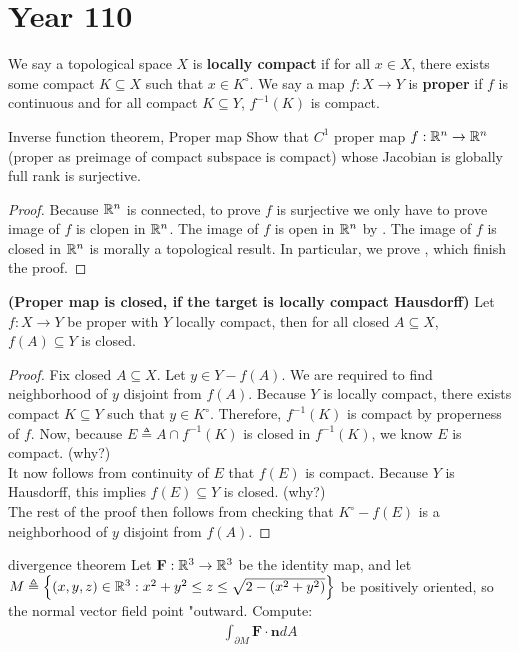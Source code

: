 \documentclass{report}
\begin{document}
\section{Year 110}
We say a topological space $X$ is \textbf{locally compact} if for all $x \in X$, there exists some compact $K \subseteq X$ such that $x \in K^{\circ }$. We say a map $f:X\rightarrow Y$ is \textbf{proper} if $f$ is continuous and for all compact $K\subseteq Y$, $f^{-1}(K)$ is compact.
\begin{question}{Inverse function theorem, Proper map}{}
  Show that $C^1$ proper map  $f:\mathbb{R}^n\rightarrow \mathbb{R}^n$ (proper as preimage of compact subspace is compact) whose Jacobian is globally full rank is surjective. 
\end{question}
\begin{proof}
  Because $\mathbb{R}^n$ is connected,  to prove $f$ is surjective we only have to prove image of $f$ is clopen in $\mathbb{R}^n$. The image of $f$ is open in $\mathbb{R}^n$ by . The image of $f$ is closed in $\mathbb{R}^n$ is morally a topological result. In particular, we prove  , which finish the proof.
\end{proof}
\begin{theorem}
\label{THpmic}
\textbf{(Proper map is closed, if the target is locally compact Hausdorff)} Let $f:X\rightarrow Y$ be proper with $Y$ locally compact, then for all closed $A \subseteq X$, $f(A)\subseteq Y$ is closed.
\end{theorem}
\begin{proof}
Fix closed $A\subseteq X$. Let $y \in Y- f(A)$. We are required to find neighborhood of $y$ disjoint from $f(A)$. Because $Y$ is locally compact, there exists compact $K \subseteq Y$ such that $y \in K^{\circ }$. Therefore, $f^{-1}(K)$ is compact by properness of $f$. Now, because $E \triangleq A \cap f^{-1}(K)$ is closed in $f^{-1}(K)$, we know $E$ is compact.  (why?)  \\

It now follows from continuity of  $E$ that $f(E)$ is compact. Because $Y$ is Hausdorff, this implies $f(E)\subseteq Y$ is closed. (why?) \\

The rest of the proof then follows from checking that $K^{\circ }-f(E)$ is a neighborhood of $y$ disjoint from $f(A)$. 
\end{proof}
\begin{question}{divergence theorem}{}
Let $\textbf{F}:\mathbb{R}^3 \rightarrow \mathbb{R}^3$ be the identity map, and let $M\triangleq \left\{ (x,y,z)\in\mathbb{R}^3: x^2+y^2 \leq z \leq \sqrt{2-(x^2+y^2)} \right\}$ be positively oriented, so the normal vector field point "outward. Compute:
\begin{align*}
\int_{\partial M} \textbf{F} \cdot \textbf{n} dA
\end{align*}
\end{question}
\end{document}
